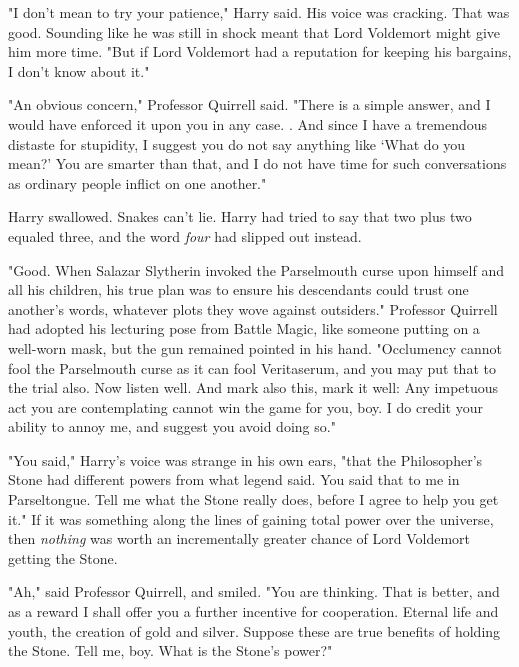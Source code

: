 "I don't mean to try your patience," Harry said. His voice was cracking. That
was good. Sounding like he was still in shock meant that Lord Voldemort might
give him more time. "But if Lord Voldemort had a reputation for keeping his
bargains, I don't know about it."

"An obvious concern," Professor Quirrell said. "There is a simple answer, and I
would have enforced it upon you in any case. . And
since I have a tremendous distaste for stupidity, I suggest you do not say
anything like `What do you mean?' You are smarter than that, and I do not have
time for such conversations as ordinary people inflict on one another."

Harry swallowed. Snakes can't lie.  Harry
had tried to say that two plus two equaled three, and the word \emph{four} had
slipped out instead.

"Good. When Salazar Slytherin invoked the Parselmouth curse upon himself and
all his children, his true plan was to ensure his descendants could trust one
another's words, whatever plots they wove against outsiders." Professor
Quirrell had adopted his lecturing pose from Battle Magic, like someone putting
on a well-worn mask, but the gun remained pointed in his hand. "Occlumency
cannot fool the Parselmouth curse as it can fool Veritaserum, and you may put
that to the trial also. Now listen well.  And mark also this, mark it well:  Any impetuous act you are
contemplating cannot win the game for you, boy. I do credit your ability to
annoy me, and suggest you avoid doing so."

"You said," Harry's voice was strange in his own ears, "that the Philosopher's
Stone had different powers from what legend said. You said that to me in
Parseltongue. Tell me what the Stone really does, before I agree to help you
get it." If it was something along the lines of gaining total power over the
universe, then \emph{nothing} was worth an incrementally greater chance of Lord
Voldemort getting the Stone.

"Ah," said Professor Quirrell, and smiled. "You are thinking. That is better,
and as a reward I shall offer you a further incentive for cooperation. Eternal
life and youth, the creation of gold and silver. Suppose these are true
benefits of holding the Stone. Tell me, boy. What is the Stone's power?"

